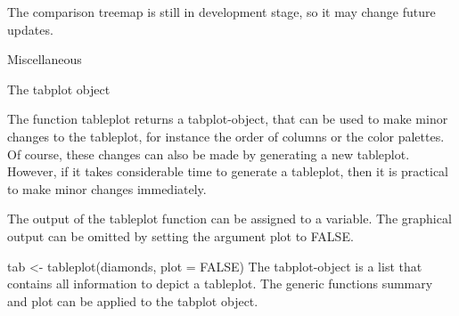 \begin{frame}
The comparison treemap is still in development stage, so it may change future updates.

Miscellaneous

The tabplot object

The function tableplot returns a tabplot-object, that can be used to make minor changes to the tableplot, for instance the order of columns or the color palettes. Of course, these changes can also be made by generating a new tableplot. However, if it takes considerable time to generate a tableplot, then it is practical to make minor changes immediately.

The output of the tableplot function can be assigned to a variable. The graphical output can be omitted by setting the argument plot to FALSE.

tab <- tableplot(diamonds, plot = FALSE)
The tabplot-object is a list that contains all information to depict a tableplot. The generic functions summary and plot can be applied to the tabplot object.


\end{frame}
